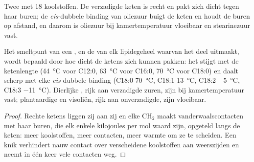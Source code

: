 \begin{omfigure}

{\small Twee  met 18 koolstoffen. De verzadigde keten is recht en pakt
zich dicht tegen haar buren; de \emph{cis}-dubbele binding van oliezuur buigt de
keten en houdt de buren op afstand, en daarom is oliezuur bij kamertemperatuur
vloeibaar en stearinezuur vast.}
\end{omfigure}

\begin{proposition}[Smeltpunten]\label{prop:b1:lipids:melting}
Het smeltpunt van een , en de  van elk lipidegeheel waarvan
het deel uitmaakt, wordt bepaald door hoe dicht de ketens zich kunnen pakken: het
stijgt met de ketenlengte (\qty{44}{\celsius} voor C12:0, \qty{63}{\celsius} voor
C16:0, \qty{70}{\celsius} voor C18:0) en daalt scherp met elke
\emph{cis}-dubbele binding (C18:0 \qty{70}{\celsius}, C18:1 \qty{13}{\celsius},
C18:2 \qty{-5}{\celsius}, C18:3 \qty{-11}{\celsius}). Dierlijke , rijk aan
verzadigde zuren, zijn bij kamertemperatuur vast; plantaardige en visoliën, rijk
aan onverzadigde, zijn vloeibaar.
\end{proposition}
\begin{proof}
Rechte ketens liggen zij aan zij en elke $\mathrm{CH_2}$ maakt
vanderwaalscontacten met haar buren, die elk enkele kilojoules per mol waard zijn,
opgeteld langs de keten: meer koolstoffen, meer contacten, meer warmte om ze te
scheiden. Een knik verhindert nauw contact over verscheidene koolstoffen aan
weerszijden en neemt in één keer vele contacten weg.
\end{proof}

